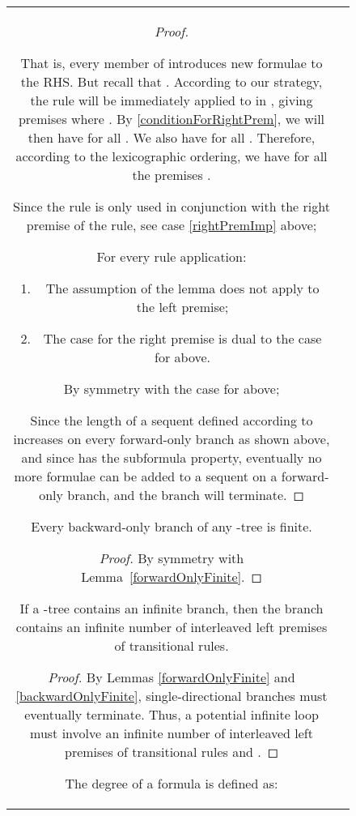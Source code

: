 \documentclass{llncs}
\numberwithin{equation}{section}
\begin{document}
\begin{figure}[t]
\begin{tabular}{cc}
\begin{proof}
\begin{description}
\begin{enumerate}
			That is, every member of  introduces new formulae to the RHS. But recall that . According to our strategy, the  rule will be immediately applied to  in , giving  premises  where . By \ref{conditionForRightPrem}, we will then have  for all . We also have  for all . Therefore, according to the lexicographic ordering, we have  for all the premises .
		\end{enumerate}			
	\item[\rm{:}] Since the  rule is only used in conjunction with the right premise of the  rule, see case \ref{rightPremImp} above;						
	\item[\rm{:}] For every  rule application:
		\begin{enumerate} 
			\item The assumption of the lemma does not apply to the left premise;
			\item The case for the right premise is dual to the case for  above.
		\end{enumerate}		
	\item[\rm{:}] By symmetry with the case for  above;			
\end{description}
Since the length of a sequent defined according to  increases on every forward-only branch as shown above, and since  has the subformula property, eventually no more formulae can be added to a sequent on a forward-only branch, and the branch will terminate.
\end{proof}

\begin{lemma}\label{backwardOnlyFinite}
Every backward-only branch of any -tree is finite.
\end{lemma}
\begin{proof}
By symmetry with Lemma~\ref{forwardOnlyFinite}.
\end{proof}

\begin{lemma}\label{infMustBeInterleaved}
If a -tree contains an infinite branch, then the branch contains an infinite number of interleaved left premises of transitional rules.
\end{lemma}
\begin{proof}
By Lemmas \ref{forwardOnlyFinite} and \ref{backwardOnlyFinite}, single-directional branches must eventually terminate. Thus, a potential infinite loop must involve an infinite number of interleaved left premises of transitional rules  and .
\end{proof}

\begin{definition}[Degree]
The degree of a  formula  is defined as:



\end{definition}
\end{tabular}
\end{figure}
\end{document}
